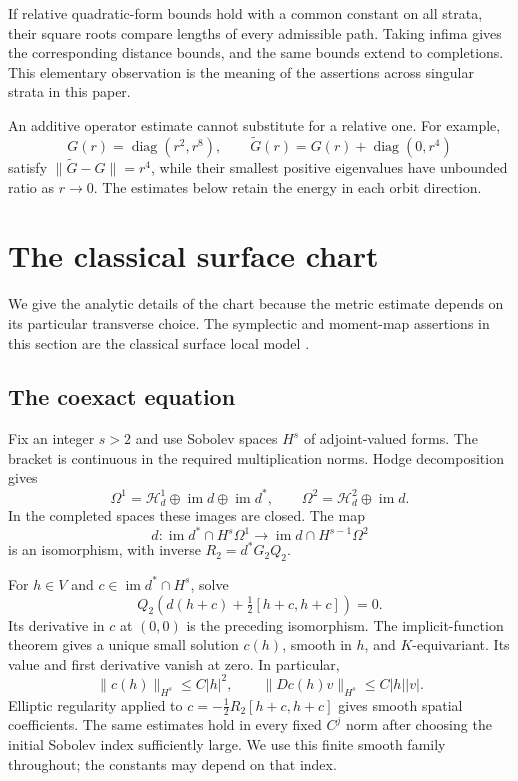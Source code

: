 \documentclass[11pt]{amsart}
\theoremstyle{definition}
\theoremstyle{remark}
\newcommand{\cH}{\mathcal H}
\newcommand{\im}{\operatorname{im}}
\newcommand{\diag}{\operatorname{diag}}
\newcommand{\norm}[1]{\lVert #1\rVert}
\begin{document}
If relative quadratic-form bounds hold with a common constant on all
strata, their square roots compare lengths of every admissible path.
Taking infima gives the corresponding distance bounds, and the same
bounds extend to completions. This elementary observation is the
meaning of the assertions across singular strata in this paper.

An additive operator estimate cannot substitute for a relative one.
For example,
\[
 G(r)=\diag(r^2,r^8),\qquad
 \widetilde G(r)=G(r)+\diag(0,r^4)
\]
satisfy $\norm{\widetilde G-G}=r^4$, while their smallest positive
eigenvalues have unbounded ratio as $r\to0$. The estimates below
retain the energy in each orbit direction.

\section{The classical surface chart}\label{sec:chart}

We give the analytic details of the chart because the metric estimate
depends on its particular transverse choice. The symplectic and
moment-map assertions in this section are the classical surface local
model \cite[Section 2]{Hue95}.

\subsection{The coexact equation}
Fix an integer $s>2$ and use Sobolev spaces $H^s$ of adjoint-valued
forms. The bracket is continuous in the required multiplication
norms. Hodge decomposition gives
\[
 \Omega^1=\cH^1_d\oplus\im d\oplus\im d^*,\qquad
 \Omega^2=\cH^2_d\oplus\im d.
\]
In the completed spaces these images are closed. The map
\[
 d:\im d^*\cap H^s\Omega^1\longrightarrow
       \im d\cap H^{s-1}\Omega^2
\]
is an isomorphism, with inverse $R_2=d^*G_2Q_2$.

For $h\in V$ and $c\in\im d^*\cap H^s$, solve
\begin{equation}\label{eq:coexact}
 Q_2\left(d(h+c)+\tfrac12[h+c,h+c]\right)=0.
\end{equation}
Its derivative in $c$ at $(0,0)$ is the preceding isomorphism.
The implicit-function theorem gives a unique small solution $c(h)$,
smooth in $h$, and $K$-equivariant. Its value
and first derivative vanish at zero. In particular,
\begin{equation}\label{eq:cest}
 \norm{c(h)}_{H^s}\leq C|h|^2,\qquad
 \norm{Dc(h)v}_{H^s}\leq C|h||v|.
\end{equation}
Elliptic regularity applied to
$c=-\tfrac12R_2[h+c,h+c]$ gives smooth spatial coefficients.
The same estimates hold in every fixed $C^j$ norm after choosing
the initial Sobolev index sufficiently large. We use this finite
smooth family throughout; the constants may depend on that index.
\end{document}
